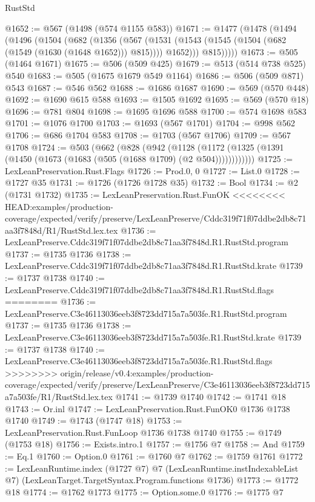 \begin{lexlean}{RustStd}
\begin{coremodule}
{\begin{coremodule}
{{{{{{{{{{{{{{{@1652 := @567 (@1498 (@574 @1155 @583))
@1671 := @1477
    (@1478
      (@1494
        (@1496
          (@1504
            (@682
              (@1356
                (@567
                  (@1531 (@1543 (@1545 (@1504 (@682 (@1549 (@1630 (@1648 @1652))) @815)))) @1652)))
              @815)))))
@1673 := @505 (@1464 @1671)
@1675 := @506 (@509 @425)
@1679 := @513 (@514 @738 @525) @540
@1683 := @505 (@1675 @1679 @549 @1164)
@1686 := @506 (@509 @871) @543
@1687 := @546 @562
@1688 := @1686 @1687
@1690 := @569 (@570 @448)
@1692 := @1690 @615 @588
@1693 := @1505 @1692
@1695 := @569 (@570 @18)
@1696 := @781 @804
@1698 := @1695 @1696 @588
@1700 := @574 @1698 @583
@1701 := @1076 @1700
@1703 := @1693 (@567 @1701)
@1704 := @998 @562
@1706 := @686 @1704 @583
@1708 := @1703 (@567 @1706)
@1709 := @567 @1708
@1724 := @503
    (@662
      (@828
        (@942
          (@1128 (@1172 (@1325 (@1391 (@1450 (@1673 (@1683 (@505 (@1688 @1709) (@2 @504))))))))))))
@1725 := LexLeanPreservation.Rust.Flags
@1726 := Prod.{0, 0}
@1727 := List.{0}
@1728 := @1727 @35
@1731 := @1726 (@1726 @1728 @35)
@1732 := Bool
@1734 := @2 (@1731 @1732)
@1735 := LexLeanPreservation.Rust.FunOK
<<<<<<<< HEAD:examples/production-coverage/expected/verify/preserve/LexLeanPreserve/Cddc319f71f07ddbe2db8c71aa3f7848d/R1/RustStd.lex.tex
@1736 := LexLeanPreserve.Cddc319f71f07ddbe2db8c71aa3f7848d.R1.RustStd.program
@1737 := @1735 @1736
@1738 := LexLeanPreserve.Cddc319f71f07ddbe2db8c71aa3f7848d.R1.RustStd.krate
@1739 := @1737 @1738
@1740 := LexLeanPreserve.Cddc319f71f07ddbe2db8c71aa3f7848d.R1.RustStd.flags
========
@1736 := LexLeanPreserve.C3e46113036eeb3f8723dd715a7a503fe.R1.RustStd.program
@1737 := @1735 @1736
@1738 := LexLeanPreserve.C3e46113036eeb3f8723dd715a7a503fe.R1.RustStd.krate
@1739 := @1737 @1738
@1740 := LexLeanPreserve.C3e46113036eeb3f8723dd715a7a503fe.R1.RustStd.flags
>>>>>>>> origin/release/v0.4:examples/production-coverage/expected/verify/preserve/LexLeanPreserve/C3e46113036eeb3f8723dd715a7a503fe/R1/RustStd.lex.tex
@1741 := @1739 @1740
@1742 := @1741 @18
@1743 := Or.inl
@1747 := LexLeanPreservation.Rust.FunOK0 @1736 @1738 @1740
@1749 := @1743 (@1747 @18)
@1753 := LexLeanPreservation.Rust.FunLoop @1736 @1738 @1740
@1755 := @1749 (@1753 @18)
@1756 := Exists.intro.{1}
@1757 := @1756 @7
@1758 := And
@1759 := Eq.{1}
@1760 := Option.{0}
@1761 := @1760 @7
@1762 := @1759 @1761
@1772 := LexLeanRuntime.index
    (@1727 @7)
    @7
    (LexLeanRuntime.instIndexableList @7)
    (LexLeanTarget.TargetSyntax.Program.functions @1736)
@1773 := @1772 @18
@1774 := @1762 @1773
@1775 := Option.some.{0}
@1776 := @1775 @7
}}}}}}}}}}}}}}}
\end{coremodule}}
\end{coremodule}
\end{lexlean}

